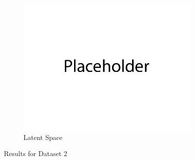 \documentclass{article}
\begin{document}
\begin{figure}[H]
\begin{subfigure}{0.32\textwidth}
        \includegraphics[width=\textwidth]{figures/q1_dset2_latents.png}
        \caption{Latent Space}
    \end{subfigure}
    \caption{Results for Dataset 2}
\end{figure}
\end{document}
